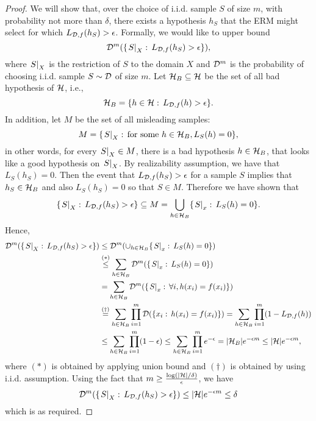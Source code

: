 \documentclass[11pt,a4paper]{article}
\begin{document}
\begin{proof}
We will show that, over the choice of i.i.d. sample $S$ of size $m$, with probability not more than $\delta$, there exists a hypothesis $h_S$ that the ERM might select for which $L_{\mathcal{D}, f}(h_S)> \epsilon$. Formally, we would like to upper bound
\begin{equation}\label{eqn:upper_bound_qty}
\mathcal{D}^m(\{\left.S\right|_{X}:\, L_{\mathcal{D},f}(h_S)>\epsilon\}),
\end{equation}
where $\left.S\right|_{X}$ is the restriction of $S$ to the domain $X$ and $\mathcal{D}^m$ is the probability of choosing i.i.d. sample $S\sim \mathcal{D}$ of size $m$. Let $\mathcal{H}_B\subseteq \mathcal{H}$ be the set of all bad hypothesis of $\mathcal{H}$, i.e.,
\begin{equation*}
\mathcal{H}_B = \{h\in \mathcal{H}:\, L_{\mathcal{D}, f}(h)>\epsilon\}.
\end{equation*}
In addition, let $M$ be the set of all misleading samples:
\begin{equation*}
M = \{ \left.S\right|_{X}:\,\text{for some }h\in \mathcal{H}_B, L_S(h) = 0 \},
\end{equation*}
in other words, for every $\left.S\right|_{X}\in M$, there is a bad hypothesis $h\in \mathcal{H}_B$, that looks like a good hypothesis on $\left.S\right|_{X}$. By realizability assumption, we have that $L_S(h_S) = 0$. Then the event that $L_{\mathcal{D},f}(h_S)>\epsilon$ for a sample $S$ implies that $h_S\in \mathcal{H}_B$ and also $L_S(h_S) = 0$ so that $S\in M$. Therefore we have shown that
\begin{equation}\label{eqn:set_inclusion_expr}
\{\left.S\right|_{X}:\, L_{\mathcal{D},f}(h_S)>\epsilon\} \subseteq M = \bigcup_{h\in \mathcal{H}_B} \{\left.S\right|_{x}:\, L_S(h) = 0\}.
\end{equation}
Hence,
\begin{align*}
\mathcal{D}^m(\{\left.S\right|_{X}:\, L_{\mathcal{D},f}(h_S)>\epsilon\}) &\le \mathcal{D}^m(\cup_{h\in \mathcal{H}_B} \{\left.S\right|_{x}:\, L_S(h) = 0\})\\
&\overset{(*)}{\le} \sum_{h\in \mathcal{H}_B}\mathcal{D}^m(\{\left.S\right|_{x}:\, L_S(h) = 0\})\\
&= \sum_{h\in \mathcal{H}_B}\mathcal{D}^m(\{\left.S\right|_{x}:\, \forall i, h(x_i) = f(x_i)\}) \\
&\overset{(\dagger)}{=} \sum_{h\in \mathcal{H}_B}\prod_{i=1}^m\mathcal{D}(\{x_i:\, h(x_i) = f(x_i)\})= \sum_{h\in \mathcal{H}_B}\prod_{i=1}^m(1-L_{\mathcal{D},f}(h))\\
&\le \sum_{h\in \mathcal{H}_B}\prod_{i=1}^m(1-\epsilon) \le \sum_{h\in \mathcal{H}_B}\prod_{i=1}^m e^{-\epsilon} = |\mathcal{H}_B|e^{-\epsilon m}
\le |\mathcal{H}|e^{-\epsilon m},
\end{align*}
where $(*)$ is obtained by applying union bound and $(\dagger)$ is obtained by using i.i.d. assumption. Using the fact that $m\ge \frac{\log(|\mathcal{H}|/\delta)}{\epsilon}$, we have 
\begin{equation*}
\mathcal{D}^m(\{\left.S\right|_{X}:\, L_{\mathcal{D},f}(h_S)>\epsilon\})\le |\mathcal{H}|e^{-\epsilon m} \le \delta
\end{equation*}
which is as required.
\end{proof}
\end{document}
